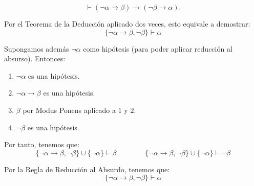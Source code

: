 \begin{ejercicio}\label{ej:1.13}
    $$\vdash (\neg\alpha \rightarrow \beta) \rightarrow (\neg\beta \rightarrow \alpha).$$
    
    Por el Teorema de la Deducción aplicado dos veces, esto equivale a demostrar:
    \begin{equation*}
        \{\neg\alpha\rightarrow\beta,\neg\beta\} \vdash \alpha
    \end{equation*}

    Supongamos además $\neg \alpha$ como hipótesis (para poder aplicar reducción al absurso). Entonces:
    \begin{enumerate}
        \item $\neg\alpha$ es una hipótesis.
        \item $\neg\alpha\rightarrow \beta$ es una hipótesis.
        \item $\beta$ por Modus Ponens aplicado a $1$ y $2$.
        \item $\neg\beta$ es una hipótesis.
    \end{enumerate}

    Por tanto, tenemos que:
    \begin{equation*}
        \{\neg\alpha\rightarrow\beta,\neg\beta\}\cup \{\neg\alpha\} \vdash \beta\qquad\qquad\{\neg\alpha\rightarrow\beta,\neg\beta\}\cup \{\neg\alpha\} \vdash \neg\beta
    \end{equation*}

    Por la Regla de Reducción al Absurdo, tenemos que:
    \begin{equation*}
        \{\neg\alpha\rightarrow\beta,\neg\beta\} \vdash \alpha
    \end{equation*}
\end{ejercicio}

